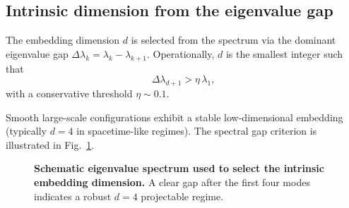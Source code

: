 \subsection{Intrinsic dimension from the eigenvalue gap}
  \label{subsec:intrinsic-dimension-from-the-eigenvalue-gap}

  The embedding dimension $d$ is selected from the spectrum via the
  dominant eigenvalue gap $\Delta\lambda_k=\lambda_k-\lambda_{k+1}$.
  Operationally, $d$ is the smallest integer such that
  \begin{equation}
    \Delta\lambda_{d+1} > \eta\,\lambda_1,
    \label{eq:eigen-gap-criterion}
  \end{equation}
  with a conservative threshold $\eta \sim 0.1$.

  Smooth large-scale configurations exhibit a stable low-dimensional
  embedding (typically $d=4$ in spacetime-like regimes).
  The spectral gap criterion is illustrated in
  Fig.~\ref{fig:eigenvalue-gap}.

  \begin{figure}[t]
    \centering
    \caption{\textbf{Schematic eigenvalue spectrum used to select the intrinsic embedding dimension.}
    A clear gap after the first four modes indicates a robust $d=4$ projectable regime.}
    \label{fig:eigenvalue-gap}
  \end{figure}
